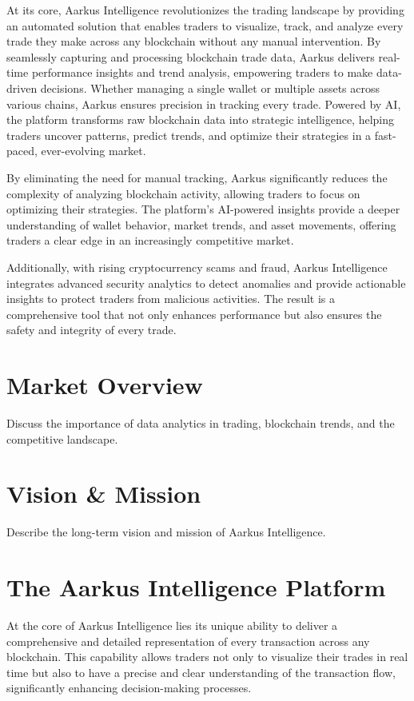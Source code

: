 \documentclass{article}
\begin{document}
  

At its core, Aarkus Intelligence revolutionizes the trading landscape by providing an automated solution that enables traders to visualize, track, and analyze every trade they make across any blockchain without any manual intervention. By seamlessly capturing and processing blockchain trade data, Aarkus delivers real-time performance insights and trend analysis, empowering traders to make data-driven decisions. Whether managing a single wallet or multiple assets across various chains, Aarkus ensures precision in tracking every trade. Powered by AI, the platform transforms raw blockchain data into strategic intelligence, helping traders uncover patterns, predict trends, and optimize their strategies in a fast-paced, ever-evolving market.

By eliminating the need for manual tracking, Aarkus significantly reduces the complexity of analyzing blockchain activity, allowing traders to focus on optimizing their strategies. The platform’s AI-powered insights provide a deeper understanding of wallet behavior, market trends, and asset movements, offering traders a clear edge in an increasingly competitive market.

Additionally, with rising cryptocurrency scams and fraud, Aarkus Intelligence integrates advanced security analytics to detect anomalies and provide actionable insights to protect traders from malicious activities. The result is a comprehensive tool that not only enhances performance but also ensures the safety and integrity of every trade.

\section{Market Overview}
Discuss the importance of data analytics in trading, blockchain trends, and the competitive landscape.

\section{Vision \& Mission}
Describe the long-term vision and mission of Aarkus Intelligence.

\section{The Aarkus Intelligence Platform}
At the core of Aarkus Intelligence lies its unique ability to deliver a comprehensive and detailed representation of every transaction across any blockchain. This capability allows traders not only to visualize their trades in real time but also to have a precise and clear understanding of the transaction flow, significantly enhancing decision-making processes.
\end{document}
